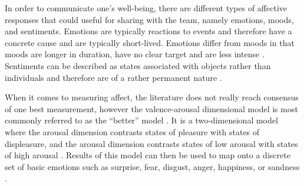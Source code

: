 
In order to communicate one's well-being, there are different types of affective responses that could useful for sharing with the team, namely emotions, moods, and sentiments. Emotions are typically reactions to events and therefore have a concrete cause and are typically short-lived. Emotions differ from moods in that moods are longer in duration, have no clear target and are less intense \autocite{frijda1994varieties, brave2007emotion}. Sentiments can be described as states associated with objects rather than individuals and therefore are of a rather permanent nature \autocite{brave2007emotion}.

When it comes to measuring affect, the literature does not really reach consensus of one best measurement, however the valence-arousal dimensional model is most commonly referred to as the ``better'' model \autocite{russell1980circumplex, mauss2009measures}. It is a two-dimensional model where the arousal dimension contrasts states of pleasure with states of displeasure, and the arousal dimension contrasts states of low arousal with states of high arousal \autocite{mauss2009measures}. Results of this model can then be used to map onto a discrete set of basic emotions such as surprise, fear, disgust, anger, happiness, or sandness \autocite{brave2007emotion}.